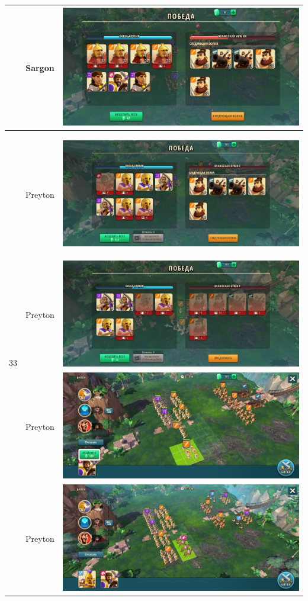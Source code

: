 \begin{longtable}{|c|c|c|}
	& Sargon &
	\includegraphics[width=0.75\linewidth]{./parts/media/TreasureHunt/33/sargon/photo_2022-04-07_10-06-34.jpg} \\
	\hline
	\multirow{12}{*}{33} & Preyton &
	\hypertarget{fight33}{\includegraphics[width=0.75\linewidth]{./parts/media/TreasureHunt/33/Preyton/33_1.jpg}} \\
	& Preyton &
	\includegraphics[width=0.75\linewidth]{./parts/media/TreasureHunt/33/Preyton/33_2.jpg} \\
	& Preyton &
	\includegraphics[width=0.75\linewidth]{./parts/media/TreasureHunt/33/Preyton/33.2.jpg} \\
	& Preyton &
	\includegraphics[width=0.75\linewidth]{./parts/media/TreasureHunt/33/Preyton/33.1.jpg} \\

\end{longtable}
